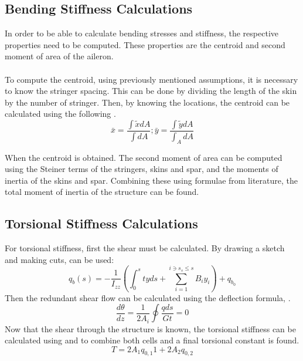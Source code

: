 \subsection{Bending Stiffness Calculations}
In order to be able to calculate bending stresses and stiffness, the respective properties need to be computed. These properties are the centroid and second moment of area of the aileron. \\ \\
To compute the centroid, using previously mentioned assumptions, it is necessary to know the stringer spacing. This can be done by dividing the length of the skin by the number of stringer. Then, by knowing the locations, the centroid can be calculated using the following .
\begin{equation}
\label{centroid}
    \bar{x}=\frac{\int \tilde{x} d A}{\int d A} ;  \bar{y}=\frac{\int \tilde{y} d A}{\int_{A} d A}
\end{equation}

When the centroid is obtained. The second moment of area can be computed using the Steiner terms of the stringers, skins and spar, and the moments of inertia of the skins and spar. Combining these using formulae from literature, the total moment of inertia of the structure can be found.

\subsection{Torsional Stiffness Calculations}\label{subsec:torsstiffcalc}

For torsional stiffness, first the shear must be calculated. By drawing a sketch and making cuts,  can be used:
\begin{equation}
\label{qb}
    q_{b}(s)=-\frac{1}{I_{z z}}\left(\int_{0}^{s} t y d s+\sum_{i=1}^{i \ni s_{s} \leq s} B_{i} y_{i}\right)+q_{b_{0}}
\end{equation}
\noindent Then the redundant shear flow can be calculated using the deflection formula, . 
\begin{equation}
\label{dtheta}
    \frac{d \theta}{d z}=\frac{1}{2 A_{i}} \oint \frac{q d s}{G t}=0
\end{equation}
Now that the shear through the structure is known, the torsional stiffness can be calculated using  and  to combine both cells and a final torsional constant is found. 
\begin{equation}
\label{T}
    T=2 A_{1} q_{0,1} 1+2 A_{2} q_{0,2}
\end{equation}

